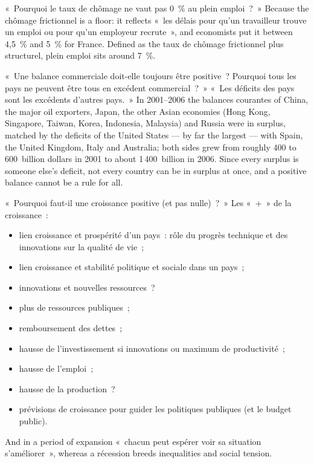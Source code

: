 \begin{example}
  «~Pourquoi le taux de chômage ne vaut pas 0~\% au plein emploi~?~» Because the
  chômage frictionnel is a floor: it reflects «~les délais pour qu'un travailleur
  trouve un emploi ou pour qu'un employeur recrute~», and economists put it
  between 4,5~\% and 5~\% for France. Defined as the taux de chômage frictionnel
  plus structurel, plein emploi sits around 7~\%.
\end{example}

\begin{example}
  «~Une balance commerciale doit-elle toujours être positive~? Pourquoi tous les
  pays ne peuvent être tous en excédent commercial~?~» «~Les déficits des pays
  sont les excédents d'autres pays.~» In 2001--2006 the balances courantes
  of China, the major oil exporters, Japan, the other Asian economies (Hong
  Kong, Singapore, Taiwan, Korea, Indonesia, Malaysia) and Russia were in
  surplus, matched by the deficits of the United States --- by far the largest
  --- with Spain, the United Kingdom, Italy and Australia; both sides grew from roughly 400 to 600~billion dollars in 2001 to about
  1\,400~billion in 2006. Since every surplus is someone else's deficit, not
  every country can be in surplus at once, and a positive balance cannot be a
  rule for all.
\end{example}

\begin{example}
  «~Pourquoi faut-il une croissance positive (et pas nulle)~?~» Les «~+~» de la
  croissance~:
  \begin{itemize}
    \item lien croissance et prospérité d'un pays~: rôle du progrès technique et
      des innovations sur la qualité de vie~;
    \item lien croissance et stabilité politique et sociale dans un pays~;
    \item innovations et nouvelles ressources~?
    \item plus de ressources publiques~;
    \item remboursement des dettes~;
    \item hausse de l'investissement si innovations ou maximum de productivité~;
    \item hausse de l'emploi~;
    \item hausse de la production~?
    \item prévisions de croissance pour guider les politiques publiques (et le
      budget public).
  \end{itemize}
  And in a period of expansion «~chacun peut espérer voir sa situation
  s'améliorer~», whereas a récession breeds inequalities and social tension.
\end{example}

